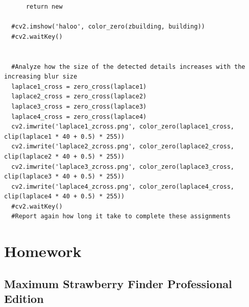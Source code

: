 \documentclass{article}
\begin{document}
\begin{verbatim}
      return new

  #cv2.imshow('haloo', color_zero(zbuilding, building))
  #cv2.waitKey()
      

  #Analyze how the size of the detected details increases with the increasing blur size
  laplace1_cross = zero_cross(laplace1)
  laplace2_cross = zero_cross(laplace2)
  laplace3_cross = zero_cross(laplace3)
  laplace4_cross = zero_cross(laplace4)
  cv2.imwrite('laplace1_zcross.png', color_zero(laplace1_cross, clip(laplace1 * 40 + 0.5) * 255))
  cv2.imwrite('laplace2_zcross.png', color_zero(laplace2_cross, clip(laplace2 * 40 + 0.5) * 255))
  cv2.imwrite('laplace3_zcross.png', color_zero(laplace3_cross, clip(laplace3 * 40 + 0.5) * 255))
  cv2.imwrite('laplace4_zcross.png', color_zero(laplace4_cross, clip(laplace4 * 40 + 0.5) * 255))
  #cv2.waitKey()
  #Report again how long it take to complete these assignments
\end{verbatim}

\section{Homework}
\subsection{Maximum Strawberry Finder Professional Edition}
 \quad
\end{document}
